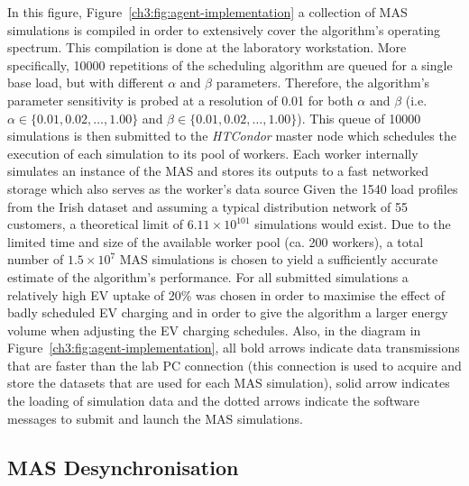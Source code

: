 In this figure, Figure~\ref{ch3:fig:agent-implementation} a collection of MAS simulations is compiled in order to extensively cover the algorithm's operating spectrum.
This compilation is done at the laboratory workstation.
More specifically, 10000 repetitions of the scheduling algorithm are queued for a single base load, but with different $\alpha$ and $\beta$ parameters.
Therefore, the algorithm's parameter sensitivity is probed at a resolution of 0.01 for both $\alpha$ and $\beta$ (i.e. $\alpha \in \{0.01, 0.02, \dots, 1.00\}$ and $\beta \in \{0.01, 0.02, \dots, 1.00\}$).
This queue of 10000 simulations is then submitted to the \textit{HTCondor} master node which schedules the execution of each simulation to its pool of workers.
Each worker internally simulates an instance of the MAS and stores its outputs to a fast networked storage which also serves as the worker's data source
Given the 1540 load profiles from the Irish dataset and assuming a typical distribution network of 55 customers, a theoretical limit of $6.11\times10^{101}$ simulations would exist.
Due to the limited time and size of the available worker pool (ca. 200 workers), a total number of $1.5\times10^{7}$ MAS simulations is chosen to yield a sufficiently accurate estimate of the algorithm's performance.
For all submitted simulations a relatively high EV uptake of 20\% was chosen in order to maximise the effect of badly scheduled EV charging and in order to give the algorithm a larger energy volume when adjusting the EV charging schedules.
Also, in the diagram in Figure~\ref{ch3:fig:agent-implementation}, all bold arrows indicate data transmissions that are faster than the lab PC connection (this connection is used to acquire and store the datasets that are used for each MAS simulation), solid arrow indicates the loading of simulation data and the dotted arrows indicate the software messages to submit and launch the MAS simulations.

\subsection{MAS Desynchronisation}
\label{ch3:subsec:desynchronisation}

